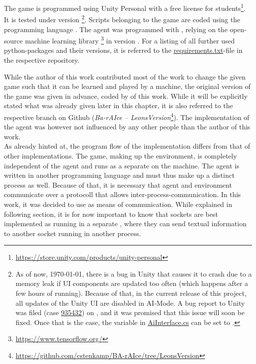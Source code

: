 The game is programmed using Unity Personal with a free license for students\footnote{\url{https://store.unity.com/products/unity-personal}}. It is tested under version \footnote{As of now, \today, there is a bug in Unity that causes it to crash due to a memory leak if UI components are updated too often (which happens after a few hours of running). Because of that, in the current release of this project, all updates of the Unity UI are disabled in AI-Mode. A bug report to Unity was filed (case \href{https://fogbugz.unity3d.com/default.asp?935432_h1bir10rkmbc658k}{935432}) on , and it was promised that this issue will soon be fixed. Once that is the case, the variable  in \href{https://github.com/cstenkamp/BA-rAIce/blob/ef2dc018f36cd9ad65df90e65d8ab840c822567e/Assets/Scripts/AiInterface.cs\#L12-L13}{AiInterface.cs} can be set to .}.
Scripts belonging to the game are coded using the programming language . The agent was programmed with , relying on the open-source machine learning library \cite{abadi_tensorflow:_2015}\footnote{\url{https://www.tensorflow.org/}} in version . For a listing of all further used python-packages and their versions, it is referred to the \href{https://github.com/cstenkamp/BA-rAIce-ANN/blob/master/requirements.txt}{requirements.txt}-file in the respective repository. 

While the author of this work contributed most of the work to change the given game such that it can be learned and played by a machine, the original version of the game was given in advance, coded by \leon of this work. While it will be explicitly stated what was already given later in this chapter, it is also referred to the respective branch on Github (\textit{Ba-rAIce -- LeonsVersion}\footnote{\url{https://github.com/cstenkamp/BA-rAIce/tree/LeonsVersion}}). The implementation of the agent was however not influenced by any other people than the author of this work.\\

\noindent As already hinted at, the program flow of the implementation differs from that of other implementations. The game, making up the environment, is completely independent of the agent and runs as a separate  on the machine. The agent is written in another programming language and must thus make up a distinct process as well. Because of that, it is necessary that agent and environment communicate over a protocoll that allows inter-process-communication. In this work, it was decided to use  as means of communication. While explained in following section, it is for now important to know that sockets are best implemented as running in a separate , where they can send textual information to another socket running in another process.

